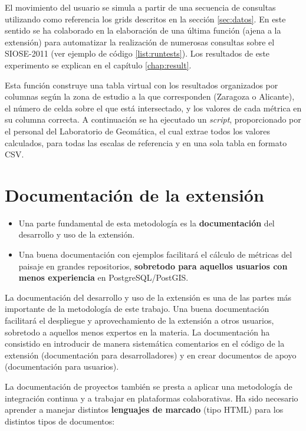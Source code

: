 El movimiento del usuario se simula a partir de una secuencia de consultas utilizando como referencia los grids descritos en la sección \ref{sec:datos}. En este sentido se ha colaborado en la elaboración de una última función (ajena a la extensión) para automatizar la realización de numerosas consultas sobre el SIOSE-2011 (ver ejemplo de código \ref{list:runtests}). Los resultados de este experimento se explican en el capítulo \ref{chap:result}.

\label{list:runtests}

Esta función construye una tabla virtual con los resultados organizados por columnas según la zona de estudio a la que corresponden (Zaragoza o Alicante), el número de celda sobre el que está intersectado, y los valores de cada métrica en su columna correcta. A continuación se ha ejecutado un \textit{script}, proporcionado por el personal del Laboratorio de Geomática, el cual extrae todos los valores calculados, para todas las escalas de referencia y en una sola tabla en formato CSV.


\section{Documentación de la extensión}

\begin{graybox}
\begin{itemize}
\item Una parte fundamental de esta metodología es la \textbf{documentación} del desarrollo y uso de la extensión. 
\item Una buena documentación con ejemplos facilitará el cálculo de métricas del paisaje en grandes repositorios, \textbf{sobretodo para aquellos usuarios con menos experiencia} en PostgreSQL/PostGIS.
\end{itemize}
\end{graybox}

La documentación del desarrollo y uso de la extensión es una de las partes más importante de la metodología de este trabajo. Una buena documentación facilitará el despliegue y aprovechamiento de la extensión a otros usuarios, sobretodo a aquellos menos expertos en la materia. La documentación ha consistido en introducir de manera sistemática comentarios en el código de la extensión (documentación para desarrolladores) y en crear documentos de apoyo (documentación para usuarios).

La documentación de proyectos también se presta a aplicar una metodología de integración continua y a trabajar en plataformas colaborativas. Ha sido necesario aprender a manejar distintos \textbf{lenguajes de marcado} (tipo HTML) para los distintos tipos de documentos:


